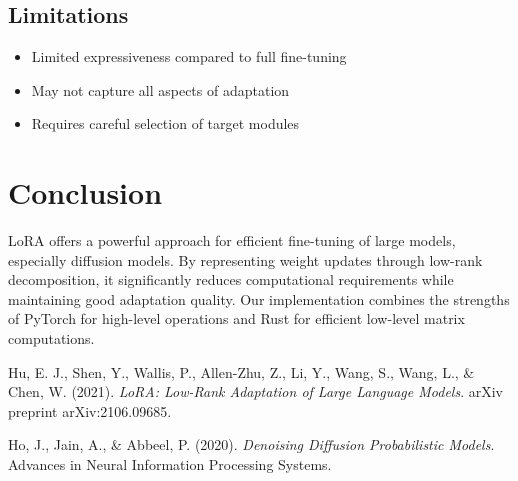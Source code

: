 \documentclass{article}
\begin{document}
\subsection{Limitations}
\begin{itemize}
    \item Limited expressiveness compared to full fine-tuning
    \item May not capture all aspects of adaptation
    \item Requires careful selection of target modules
\end{itemize}

\section{Conclusion}

LoRA offers a powerful approach for efficient fine-tuning of large models, especially diffusion models. By representing weight updates through low-rank decomposition, it significantly reduces computational requirements while maintaining good adaptation quality. Our implementation combines the strengths of PyTorch for high-level operations and Rust for efficient low-level matrix computations.

\begin{thebibliography}{9}
Hu, E. J., Shen, Y., Wallis, P., Allen-Zhu, Z., Li, Y., Wang, S., Wang, L., \& Chen, W. (2021).
\textit{LoRA: Low-Rank Adaptation of Large Language Models}.
arXiv preprint arXiv:2106.09685.

Ho, J., Jain, A., \& Abbeel, P. (2020).
\textit{Denoising Diffusion Probabilistic Models}.
Advances in Neural Information Processing Systems.
\end{thebibliography}
\end{document}
